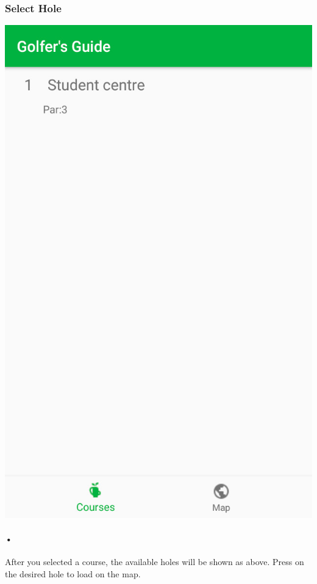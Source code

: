 \documentclass{article}
\begin{document}
	\subsubsection{Select Hole}
	\includegraphics[scale=0.7]{2_holes}
	\paragraph{•}
	After you selected a course, the available holes will be shown as above. Press on the desired hole to load on the map.
	
\end{document}
